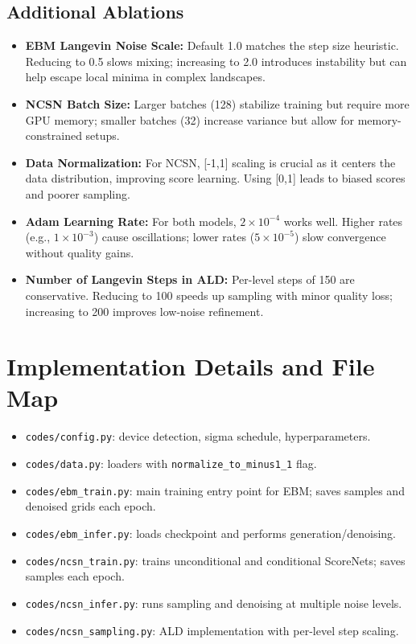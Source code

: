\documentclass[a4paper,12pt]{article}
\begin{document}
\subsection{Additional Ablations}
\begin{itemize}[leftmargin=*]
    \item \textbf{EBM Langevin Noise Scale:} Default 1.0 matches the step size heuristic. Reducing to 0.5 slows mixing; increasing to 2.0 introduces instability but can help escape local minima in complex landscapes.
    \item \textbf{NCSN Batch Size:} Larger batches (128) stabilize training but require more GPU memory; smaller batches (32) increase variance but allow for memory-constrained setups.
    \item \textbf{Data Normalization:} For NCSN, [-1,1] scaling is crucial as it centers the data distribution, improving score learning. Using [0,1] leads to biased scores and poorer sampling.
    \item \textbf{Adam Learning Rate:} For both models, $2\times10^{-4}$ works well. Higher rates (e.g., $1\times10^{-3}$) cause oscillations; lower rates ($5\times10^{-5}$) slow convergence without quality gains.
    \item \textbf{Number of Langevin Steps in ALD:} Per-level steps of 150 are conservative. Reducing to 100 speeds up sampling with minor quality loss; increasing to 200 improves low-noise refinement.
\end{itemize}

\section{Implementation Details and File Map}
\begin{itemize}[leftmargin=*]
    \item \texttt{codes/config.py}: device detection, sigma schedule, hyperparameters.
    \item \texttt{codes/data.py}: loaders with \texttt{normalize\_to\_minus1\_1} flag.
    \item \texttt{codes/ebm\_train.py}: main training entry point for EBM; saves samples and denoised grids each epoch.
    \item \texttt{codes/ebm\_infer.py}: loads checkpoint and performs generation/denoising.
    \item \texttt{codes/ncsn\_train.py}: trains unconditional and conditional ScoreNets; saves samples each epoch.
    \item \texttt{codes/ncsn\_infer.py}: runs sampling and denoising at multiple noise levels.
    \item \texttt{codes/ncsn\_sampling.py}: ALD implementation with per-level step scaling.
\end{itemize}
\end{document}
